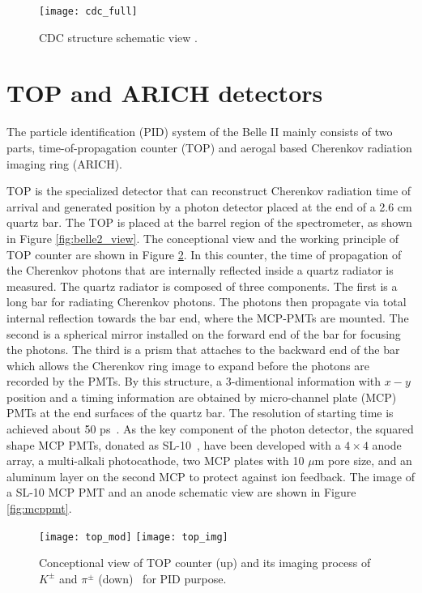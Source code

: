 \begin{figure}[htpb]
	\centering
	\texttt{[image: cdc\_full]}
	\caption{CDC structure schematic view \cite{Abe:2010gxa}.}
	\label{fig:cdc_full}
\end{figure}





\section{TOP and ARICH detectors}
The particle identification (PID) system of the Belle II mainly consists of two parts, time-of-propagation counter (TOP) and aerogal based Cherenkov radiation imaging ring (ARICH).

TOP is the specialized detector that can reconstruct Cherenkov radiation time of arrival and generated position by a photon detector placed at the end of a 2.6 cm quartz bar. The TOP is placed at the barrel region of the spectrometer, as shown in Figure \ref{fig:belle2_view}. The conceptional view and the working principle of TOP counter are shown in Figure \ref{fig:top}. In this counter, the time of propagation of the Cherenkov photons that are internally
reflected inside a quartz radiator is measured. The quartz radiator is composed of three components. The first is a long bar for radiating Cherenkov photons. The photons then propagate via total internal reflection towards the bar end, where the MCP-PMTs are mounted. The second is a spherical mirror installed on the forward end of the bar for focusing the photons. The third is a prism that attaches to the backward end of the bar which allows the Cherenkov ring image to expand before the photons are recorded by the PMTs. By this structure, a 3-dimentional information with $x-y$ position and a timing information are obtained by micro-channel plate (MCP) PMTs at the end surfaces of the quartz bar.
The resolution of starting time is achieved about 50 ps~\cite{Abe:2010gxa}. As the key component of the photon detector, the squared shape MCP PMTs, donated as SL-10~\cite{inami2008cross}, have been developed with a $4\times 4$ anode array, a multi-alkali photocathode,
two MCP plates with 10 $\mu$m pore size, and an aluminum layer on the second MCP to protect
against ion feedback. The image of a SL-10 MCP PMT and an anode schematic view are shown in Figure \ref{fig:mcppmt}. 

\begin{figure}[htpb]
	\centering
	\texttt{[image: top\_mod]}
	\texttt{[image: top\_img]}
	\caption{Conceptional view of TOP counter (up) and its imaging process of $K^{\pm}$ and $\pi^{\pm}$ (down)~\cite{Abe:2010gxa} for PID purpose.}
	\label{fig:top}
\end{figure}


